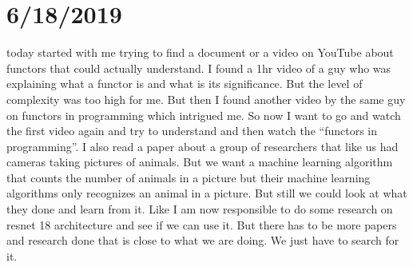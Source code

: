\documentclass{article}
\begin{document}
\section{6/18/2019}
today started with me trying to find a document or a video on YouTube about functors that could actually understand. I found a 1hr video of a guy who was explaining what a functor is and what is its significance. But the level of complexity was too high for me. But then I found another video by the same guy on functors in programming which intrigued me. So now I want to go and watch the first video again and try to understand and then watch the “functors in programming”.
I also read a paper about a group of researchers that like us had cameras taking pictures of animals. But we want a machine learning algorithm that counts the number of animals in a picture but their machine learning algorithms only recognizes an animal in a picture. But still we could look at what they done and learn from it. Like I am now responsible to do some research on resnet 18 architecture and see if we can use it.
But there has to be more papers and research done that is close to what we are doing. We just have to search for it.
\end{document}
